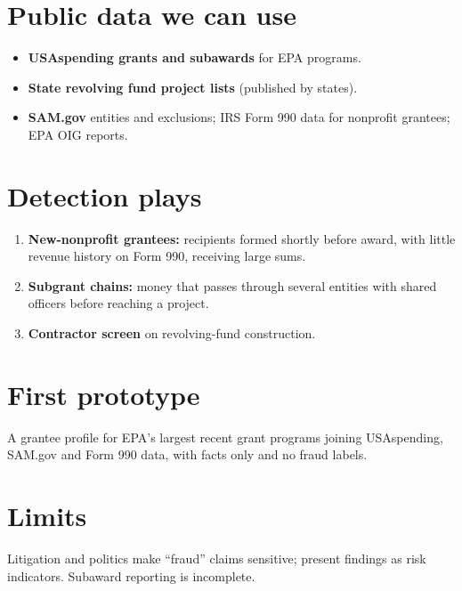 \documentclass[letterpaper,11pt]{article}
\providecommand{\tightlist}{\setlength{\itemsep}{0pt}\setlength{\parskip}{0pt}}
\begin{document}
\hypertarget{public-data-we-can-use}{%
\section{Public data we can use}\label{public-data-we-can-use}}

\begin{itemize}
\tightlist
\item
  \textbf{USAspending grants and subawards} for EPA programs.
\item
  \textbf{State revolving fund project lists} (published by states).
\item
  \textbf{SAM.gov} entities and exclusions; IRS Form 990 data for
  nonprofit grantees; EPA OIG reports.
\end{itemize}

\hypertarget{detection-plays}{%
\section{Detection plays}\label{detection-plays}}

\begin{enumerate}
\def\labelenumi{\arabic{enumi}.}
\tightlist
\item
  \textbf{New-nonprofit grantees:} recipients formed shortly before
  award, with little revenue history on Form 990, receiving large sums.
\item
  \textbf{Subgrant chains:} money that passes through several entities
  with shared officers before reaching a project.
\item
  \textbf{Contractor screen} on revolving-fund construction.
\end{enumerate}

\hypertarget{first-prototype}{%
\section{First prototype}\label{first-prototype}}

A grantee profile for EPA's largest recent grant programs joining
USAspending, SAM.gov and Form 990 data, with facts only and no fraud
labels.

\hypertarget{limits}{%
\section{Limits}\label{limits}}

Litigation and politics make ``fraud'' claims sensitive; present
findings as risk indicators. Subaward reporting is incomplete.
\end{document}
